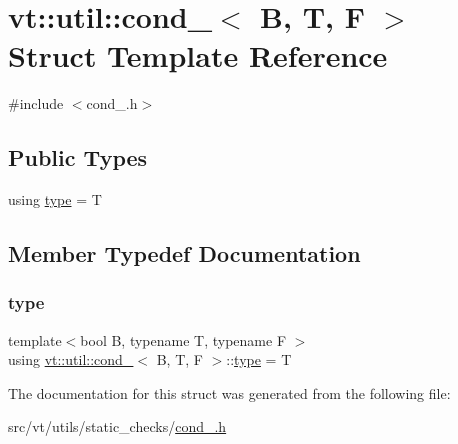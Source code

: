 \hypertarget{structvt_1_1util_1_1cond__}{}\section{vt\+:\+:util\+:\+:cond\+\_\+$<$ B, T, F $>$ Struct Template Reference}
\label{structvt_1_1util_1_1cond__}


{\ttfamily \#include $<$cond\+\_\+.\+h$>$}

\subsection*{Public Types}
\begin{DoxyCompactItemize}
\item 
using \hyperlink{structvt_1_1util_1_1cond___a28c21b3840f7bf044e1384c1c853b621}{type} = T
\end{DoxyCompactItemize}


\subsection{Member Typedef Documentation}
\mbox{\label{structvt_1_1util_1_1cond___a28c21b3840f7bf044e1384c1c853b621}} 
\subsubsection{\texorpdfstring{type}{type}}
{\footnotesize\ttfamily template$<$bool B, typename T, typename F $>$ \\
using \hyperlink{structvt_1_1util_1_1cond__}{vt\+::util\+::cond\+\_\+}$<$ B, T, F $>$\+::\hyperlink{structvt_1_1util_1_1cond___a28c21b3840f7bf044e1384c1c853b621}{type} =  T}



The documentation for this struct was generated from the following file\+:\begin{DoxyCompactItemize}
\item 
src/vt/utils/static\+\_\+checks/\hyperlink{cond___8h}{cond\+\_\+.\+h}\end{DoxyCompactItemize}
